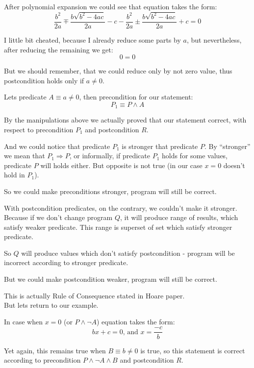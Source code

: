 \documentclass[twoside,twocolumn]{article}
\renewcommand{\implies}{\Rightarrow}
\begin{document}
After polynomial expansion we could see that equation takes the form:
$$\frac{b^2}{2a} \mp \frac{b\sqrt{b^2 - 4ac}}{2a} - c - \frac{b^2}{2a} \pm
\frac{b\sqrt{b^2 - 4ac}}{2a} + c = 0$$

I little bit cheated, because I already reduce some parts by $a$, but
nevertheless, after reducing the remaining we get:
$$ 0 = 0 $$

But we should remember, that we could reduce only by not zero value, thus
postcondition holds only if $a \neq 0$.

Lets predicate $A \equiv a \neq 0$, then precondition for our statement:
$$ P_1 \equiv P \wedge A $$

By the manipulations above we actually proved that our statement correct, with
respect to precondition $P_1$ and postcondition $R$.

And we could notice that predicate $P_1$ is stronger that predicate $P$. By
``stronger'' we mean that $P_1 \implies P$, or informally, if predicate $P_1$
holds for some values, predicate $P$ will holds either. But opposite is not true
(in our case $x = 0$ doesn't hold in $P_1$).

So we could make preconditions stronger, program will still be correct.

With postcondition predicates, on the contrary, we couldn't make it
stronger.
Because if we don't change program $Q$, it will produce range of
results, which satisfy weaker predicate.
This range is superset of set which satisfy stronger predicate.

So $Q$ will produce values which don't satisfy postcondition - program will be
incorrect according to stronger predicate.

But we could make postcondition weaker, program will still be correct.

This is actually Rule of Consequence stated in Hoare paper.\\

But lets return to our example.


In case when $x = 0$ (or $P \wedge \neg A$) equation takes the form:
\begin{equation}
 bx + c = 0 \text{, and } x = \frac{-c}{b}
\end{equation}

Yet again, this remains true when $B \equiv b \neq 0$ is true, so this statement
is correct according to precondition $P \wedge \neg A \wedge B$ and
postcondition $R$.
\end{document}

